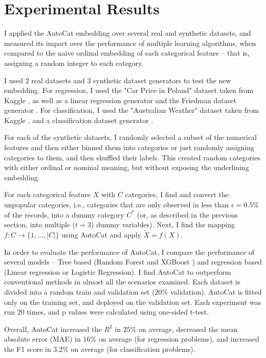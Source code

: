 \documentclass{article}
\begin{document}
\section{Experimental Results}
\label{section:results}

I applied the AutoCat embedding over several real and synthetic datasets, and measured its impact over the performance of multiple learning algorithms, when compared to the naive ordinal embedding of each categorical feature -- that is, assigning a random integer to each category.

I used 2 real datasets and 3 synthetic dataset generators to test the new embedding. For regression, I used the "Car Price in Poland" dataset taken from Kaggle \cite{carPricesPoland}, as well as a linear regression generator and the Friedman dataset generator \cite{Friedman1991}. For classification, I used the "Australian Weather" dataset taken from Kaggle \cite{rainInAustralia}, and a classification dataset generator \cite{scikit-learn}.

For each of the synthetic datasets, I randomly selected a subset of the numerical features and then either binned them into categories or just randomly assigning categories to them, and then shuffled their labels. This created random categories with either ordinal or nominal meaning, but without exposing the underlining embedding.

For each categorical feature $X$ with $C$ categories, I find and convert the unpopular categories, i.e., categories that are only observed in less than $\epsilon = 0.5\%$ of the records, into a dummy category $C^*$ (or, as described in the previous section, into multiple ($t=3$) dummy variables). Next, I find the mapping $f: C\to \{1,\dots, |C|\}$ using AutoCat and apply $\tilde{X} = f(X)$.

In order to evaluate the performance of AutoCat, I compare the performance of several models -- Tree based (Random Forest \cite{Ho95} and XGBoost \cite{Chen:2016:XST:2939672.2939785}) and regression based (Linear regression or Logistic Regression). I find AutoCat to outperform conventional methods in almost all the scenarios examined. Each dataset is divided into a random train and validation set ($20\%$ validation). AutoCat is fitted only on the training set, and deployed on the validation set. Each experiment was run 20 times, and p values were calculated using one-sided t-test. 

Overall, AutoCat increased the $R^2$ in $25\%$ on average, decreased the mean absolute error (MAE) in $16\%$ on average (for regression problems), and increased the F1 score in $3.2\%$ on average (for classification problems).
\end{document}
